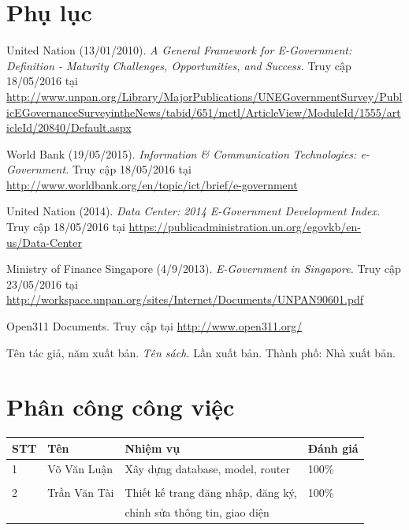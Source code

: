 \documentclass[a4paper]{article}
\begin{document}
\section{Phụ lục}
\begin{thebibliography}{99}
United Nation (13/01/2010). \textit{A General Framework for E-Government: Definition - Maturity Challenges, Opportunities, and Success.} Truy cập 18/05/2016 tại \url{http://www.unpan.org/Library/MajorPublications/UNEGovernmentSurvey/PublicEGovernanceSurveyintheNews/tabid/651/mctl/ArticleView/ModuleId/1555/articleId/20840/Default.aspx}

World Bank (19/05/2015). \textit{Information \& Communication Technologies: e-Government.} Truy cập 18/05/2016 tại \url{http://www.worldbank.org/en/topic/ict/brief/e-government}

United Nation (2014). \textit{Data Center: 2014 E-Government Development Index.} Truy cập 18/05/2016 tại \url{https://publicadministration.un.org/egovkb/en-us/Data-Center}

Ministry of Finance Singapore (4/9/2013). \textit{E-Government in Singapore.} Truy cập 23/05/2016 tại \url{http://workspace.unpan.org/sites/Internet/Documents/UNPAN90601.pdf}

Open311 Documents. Truy cập tại
 \url{http://www.open311.org/} 

\bibitem{}
Tên tác giả, năm xuất bản. \textit{Tên sách.} Lần xuất bản. Thành phố: Nhà xuất bản.

\end{thebibliography}

\newpage
\section*{Phân công công việc}

    \begin{center}
        \begin{table}[h]
            \begin{tabular}{|l|l|l|l|}
            \hline
            STT & Tên & Nhiệm vụ & Đánh giá\\
            \hline
            1 & Võ Văn Luận & Xây dựng database, model, router & 100\%\\
              & &         & \\
            \hline
            2 & Trần Văn Tài & Thiết kế trang đăng nhập, đăng ký, & 100\%\\
              & & chỉnh sửa thông tin, giao diện &\\
            \hline
            \end{tabular}
        \end{table}    
    \end{center}

\listoffigures
\newpage
\end{document}
